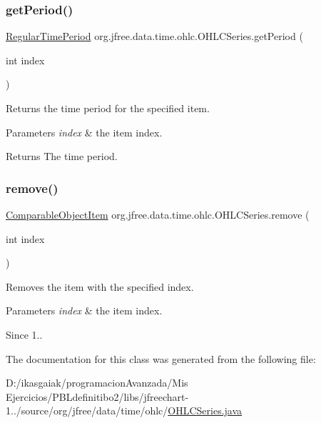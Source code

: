 \subsubsection{\texorpdfstring{get\+Period()}{getPeriod()}}
{\footnotesize\ttfamily \mbox{\hyperlink{classorg_1_1jfree_1_1data_1_1time_1_1_regular_time_period}{Regular\+Time\+Period}} org.\+jfree.\+data.\+time.\+ohlc.\+O\+H\+L\+C\+Series.\+get\+Period (\begin{DoxyParamCaption}\item[{int}]{index }\end{DoxyParamCaption})}

Returns the time period for the specified item.


\begin{DoxyParams}{Parameters}
{\em index} & the item index.\\
\hline
\end{DoxyParams}
\begin{DoxyReturn}{Returns}
The time period. 
\end{DoxyReturn}
\mbox{\label{classorg_1_1jfree_1_1data_1_1time_1_1ohlc_1_1_o_h_l_c_series_a7d43ed5430d46a4cdc097a4fb15a24b9}} 
\subsubsection{\texorpdfstring{remove()}{remove()}}
{\footnotesize\ttfamily \mbox{\hyperlink{classorg_1_1jfree_1_1data_1_1_comparable_object_item}{Comparable\+Object\+Item}} org.\+jfree.\+data.\+time.\+ohlc.\+O\+H\+L\+C\+Series.\+remove (\begin{DoxyParamCaption}\item[{int}]{index }\end{DoxyParamCaption})}

Removes the item with the specified index.


\begin{DoxyParams}{Parameters}
{\em index} & the item index.\\
\hline
\end{DoxyParams}
\begin{DoxySince}{Since}
1.. 
\end{DoxySince}


The documentation for this class was generated from the following file\+:\begin{DoxyCompactItemize}
\item 
D\+:/ikasgaiak/programacion\+Avanzada/\+Mis Ejercicios/\+P\+B\+Ldefinitibo2/libs/jfreechart-\/1../source/org/jfree/data/time/ohlc/\mbox{\hyperlink{_o_h_l_c_series_8java}{O\+H\+L\+C\+Series.\+java}}\end{DoxyCompactItemize}
